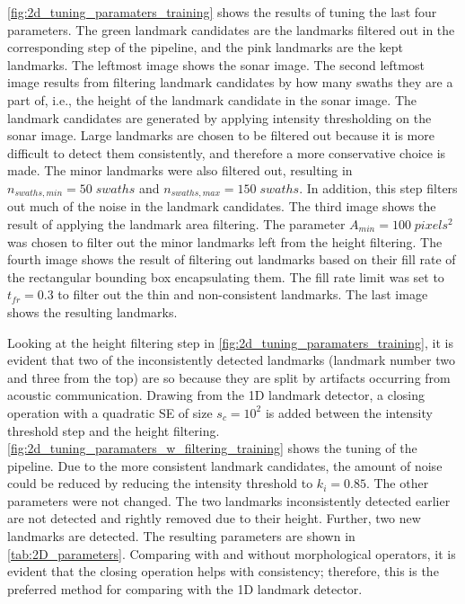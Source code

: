 \cref{fig:2d_tuning_paramaters_training} shows the results of tuning the last four parameters. The green landmark candidates are the landmarks filtered out in the corresponding step of the pipeline, and the pink landmarks are the kept landmarks. The leftmost image shows the sonar image. The second leftmost image results from filtering landmark candidates by how many swaths they are a part of, i.e., the height of the landmark candidate in the sonar image. The landmark candidates are generated by applying intensity thresholding on the sonar image. Large landmarks are chosen to be filtered out because it is more difficult to detect them consistently, and therefore a more conservative choice is made. The minor landmarks were also filtered out, resulting in $n_{swaths, min} = 50 \; swaths$ and $n_{swaths, max} = 150 \; swaths$. In addition, this step filters out much of the noise in the landmark candidates. The third image shows the result of applying the landmark area filtering. The parameter $A_{min} = 100 \;pixels^2$ was chosen to filter out the minor landmarks left from the height filtering. The fourth image shows the result of filtering out landmarks based on their fill rate of the rectangular bounding box encapsulating them. The fill rate limit was set to $t_{fr} = 0.3$ to filter out the thin and non-consistent landmarks. The last image shows the resulting landmarks.

Looking at the height filtering step in \cref{fig:2d_tuning_paramaters_training}, it is evident that two of the inconsistently detected landmarks (landmark number two and three from the top) are so because they are split by artifacts occurring from acoustic communication. Drawing from the 1D landmark detector, a closing operation with a quadratic SE of size $s_c = 10^2$ is added between the intensity threshold step and the height filtering. \cref{fig:2d_tuning_paramaters_w_filtering_training} shows the tuning of the pipeline. Due to the more consistent landmark candidates, the amount of noise could be reduced by reducing the intensity threshold to $k_i = 0.85$. The other parameters were not changed. The two landmarks inconsistently detected earlier are not detected and rightly removed due to their height. Further, two new landmarks are detected. The resulting parameters are shown in \cref{tab:2D_parameters}. Comparing with and without morphological operators, it is evident that the closing operation helps with consistency; therefore, this is the preferred method for comparing with the 1D landmark detector. 

